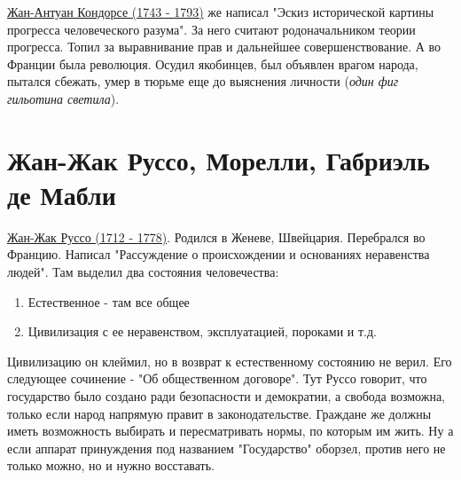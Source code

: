 \underline{Жан-Антуан Кондорсе (1743 - 1793)} же написал "Эскиз исторической картины прогресса человеческого разума". За него считают родоначальником теории прогресса. Топил за выравнивание прав и дальнейшее совершенствование. А во Франции была революция. Осудил якобинцев, был объявлен врагом народа, пытался сбежать, умер в тюрьме еще до выяснения личности (\textit{один фиг гильотина светила}). 

\section{Жан-Жак Руссо, Морелли, Габриэль де Мабли}
\underline{Жан-Жак Руссо (1712 - 1778)}. Родился в Женеве, Швейцария. Перебрался во Францию. Написал "Рассуждение о происхождении и основаниях неравенства людей". Там выделил два состояния человечества:
\begin{enumerate}
\item Естественное - там все общее 
\item Цивилизация с ее неравенством, эксплуатацией, пороками и т.д.
\end{enumerate}
Цивилизацию он клеймил, но в возврат к естественному состоянию не верил. Его следующее сочинение - "Об общественном договоре". Тут Руссо говорит, что государство было создано ради безопасности и демократии, а свобода возможна, только если народ напрямую правит в законодательстве. Граждане же должны иметь возможность выбирать и пересматривать нормы, по которым им жить. Ну а если аппарат принуждения под названием "Государство" оборзел, против него не только можно, но и нужно восставать. 

